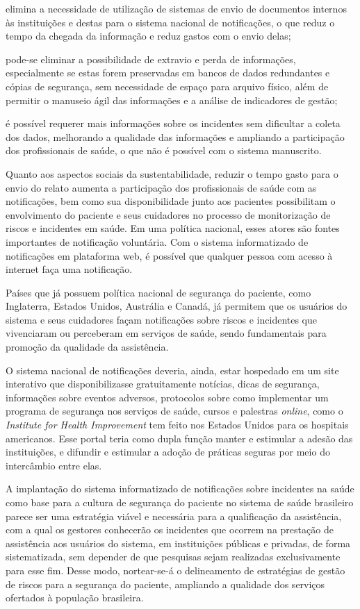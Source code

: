 \documentclass{article}
\begin{document}
elimina a necessidade de utilização de sistemas de envio de documentos internos
às
instituições e destas para o sistema nacional de notificações, o que reduz o
tempo da
chegada da informação e reduz gastos com o envio delas;

pode-se eliminar a possibilidade de extravio e perda de informações,
especialmente se
estas forem preservadas em bancos de dados redundantes e cópias de segurança,
sem
necessidade de espaço para arquivo físico, além de permitir o manuseio ágil das
informações e a análise de indicadores de gestão;

é possível requerer mais informações sobre os incidentes sem dificultar a coleta
dos
dados, melhorando a qualidade das informações e ampliando a participação dos
profissionais de saúde, o que não é possível com o sistema manuscrito.

Quanto aos aspectos sociais da sustentabilidade, reduzir o tempo gasto para o
envio do
relato aumenta a participação dos profissionais de saúde com as notificações,
bem como sua
disponibilidade junto aos pacientes possibilitam o envolvimento do paciente e
seus
cuidadores no processo de monitorização de riscos e incidentes em saúde. Em uma
política
nacional, esses atores são fontes importantes de notificação voluntária. Com o
sistema
informatizado de notificações em plataforma web, é possível que qualquer pessoa
com acesso à
internet faça uma notificação.

Países que já possuem política nacional de segurança do paciente, como
Inglaterra, Estados
Unidos, Austrália e Canadá, já permitem que os usuários do sistema e seus
cuidadores façam
notificações sobre riscos e incidentes que vivenciaram ou perceberam em serviços
de saúde,
sendo fundamentais para promoção da qualidade da assistência.

O sistema nacional de notificações deveria, ainda, estar hospedado em um site
interativo
que disponibilizasse gratuitamente notícias, dicas de segurança, informações
sobre eventos
adversos, protocolos sobre como implementar um programa de segurança nos
serviços de saúde,
cursos e palestras \textit{online}, como o \textit{Institute for Health
Improvement}
tem feito nos Estados Unidos para os hospitais americanos. Esse
portal teria como dupla função manter e estimular a adesão das instituições, e
difundir e
estimular a adoção de práticas seguras por meio do intercâmbio entre elas.

A implantação do sistema informatizado de notificações sobre incidentes na saúde
como base
para a cultura de segurança do paciente no sistema de saúde brasileiro parece
ser uma
estratégia viável e necessária para a qualificação da assistência, com a qual os
gestores
conhecerão os incidentes que ocorrem na prestação de assistência aos usuários do
sistema, em
instituições públicas e privadas, de forma sistematizada, sem depender de que
pesquisas
sejam realizadas exclusivamente para esse fim. Desse modo, nortear-se-á o
delineamento de
estratégias de gestão de riscos para a segurança do paciente, ampliando a
qualidade dos
serviços ofertados à população brasileira.
\end{document}
